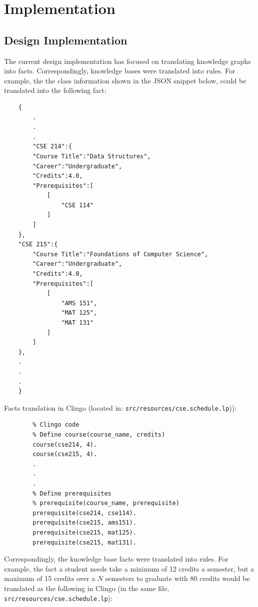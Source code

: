 \documentclass[12pt]{article}
\begin{document}
    \section{Implementation}
    \label{sec:implement}

    \subsection{Design Implementation}
    \label{subsec:des-imp}

    The current design implementation has focused on translating knowledge graphs into facts. Correspondingly, knowledge bases were translated into rules. For example, the the class information shown in the JSON snippet below,  could be translated into the following fact:

    \begin{lstlisting}
    {
        .
        .
        .
        "CSE 214":{
        "Course Title":"Data Structures",
        "Career":"Undergraduate",
        "Credits":4.0,
        "Prerequisites":[
            [
                "CSE 114"
            ]
        ]
    },
    "CSE 215":{
        "Course Title":"Foundations of Computer Science",
        "Career":"Undergraduate",
        "Credits":4.0,
        "Prerequisites":[
            [
                "AMS 151",
                "MAT 125",
                "MAT 131"
            ]
        ]
    },
    .
    .
    .
    }
    \end{lstlisting}

    Facts translation in Clingo (located in: {\tt{src/resources/cse.schedule.lp}})): \\
    
    \begin{lstlisting}
        % Clingo code
        % Define course(course_name, credits)
        course(cse214, 4).
        course(cse215, 4).
        .
        .
        .
        % Define prerequisites
        % prerequisite(course_name, prerequisite)
        prerequisite(cse214, cse114).
        prerequisite(cse215, ams151).
        prerequisite(cse215, mat125).
        prerequisite(cse215, mat131).
    \end{lstlisting}

    Correspondingly, the knowledge base facts were translated into rules. For example, the fact a student needs take a minimum of 12 credits a semester, but a maximum of 15 credits over a $N$ semesters to graduate with 80 credits would be translated as the following in Clingo (in the same file, {\tt{src/resources/cse.schedule.lp}}): \\
\end{document}
